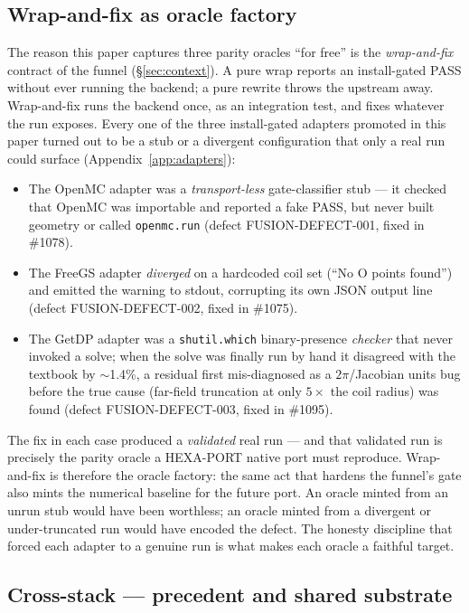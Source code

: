 \subsection{Wrap-and-fix as oracle factory}
\label{app:hexaport:wrapfix}

The reason this paper captures three parity oracles ``for free'' is the
\emph{wrap-and-fix} contract of the funnel (\S\ref{sec:context}). A pure
wrap reports an install-gated PASS without ever running the backend; a
pure rewrite throws the upstream away. Wrap-and-fix runs the backend
once, as an integration test, and fixes whatever the run exposes. Every
one of the three install-gated adapters promoted in this paper turned
out to be a stub or a divergent configuration that only a real run could
surface (Appendix~\ref{app:adapters}):
\begin{itemize}\itemsep0.2em
\item The OpenMC adapter was a \emph{transport-less} gate-classifier
stub --- it checked that OpenMC was importable and reported a fake PASS,
but never built geometry or called \texttt{openmc.run} (defect
FUSION-DEFECT-001, fixed in \#1078).
\item The FreeGS adapter \emph{diverged} on a hardcoded coil set (``No O
points found'') and emitted the warning to stdout, corrupting its own
JSON output line (defect FUSION-DEFECT-002, fixed in \#1075).
\item The GetDP adapter was a \texttt{shutil.which} binary-presence
\emph{checker} that never invoked a solve; when the solve was finally
run by hand it disagreed with the textbook by $\sim$1.4\%, a residual
first mis-diagnosed as a $2\pi$/Jacobian units bug before the true cause
(far-field truncation at only $5\times$ the coil radius) was found
(defect FUSION-DEFECT-003, fixed in \#1095).
\end{itemize}
The fix in each case produced a \emph{validated} real run --- and that
validated run is precisely the parity oracle a HEXA-PORT native port
must reproduce. Wrap-and-fix is therefore the oracle factory: the same
act that hardens the funnel's gate also mints the numerical baseline for
the future port. An oracle minted from an unrun stub would have been
worthless; an oracle minted from a divergent or under-truncated run
would have encoded the defect. The honesty discipline that forced each
adapter to a genuine run is what makes each oracle a faithful target.

\subsection{Cross-stack --- precedent and shared substrate}
\label{app:hexaport:crossstack}

